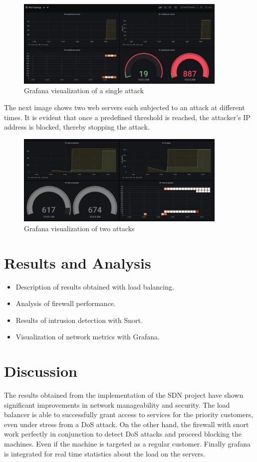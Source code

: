 \documentclass[a4paper,12pt]{article}
\begin{document}
\begin{figure}[h]
\centering
\includegraphics[width=0.9\textwidth]{grafana2.jpg}
\caption{Grafana visualization of a single attack}
\label{fig
}
\end{figure}

The next image shows two web servers each subjected to an attack at different times. It is evident that once a predefined threshold is reached, the attacker's IP address is blocked, thereby stopping the attack.

\begin{figure}[h]
\centering
\includegraphics[width=0.9\textwidth]{grafana1.jpg}
\caption{Grafana visualization of two attacks}
\label{fig
}
\end{figure}

\section{Results and Analysis}
\begin{itemize}
    \item Description of results obtained with load balancing.
    \item Analysis of firewall performance.
    \item Results of intrusion detection with Snort.
    \item Visualization of network metrics with Grafana.
\end{itemize}

\section{Discussion}
The results obtained from the implementation of the SDN project have shown significant improvements in network manageability and security. The load balancer is able to successfully grant access to services for the priority customers, even under stress from a DoS attack.
On the other hand, the firewall with snort work perfectly in conjunction to detect DoS attacks and proceed blocking the machines. Even if the machine is targeted as a regular customer.
Finally grafana is integrated for real time statistics about the load on the servers.
\end{document}
